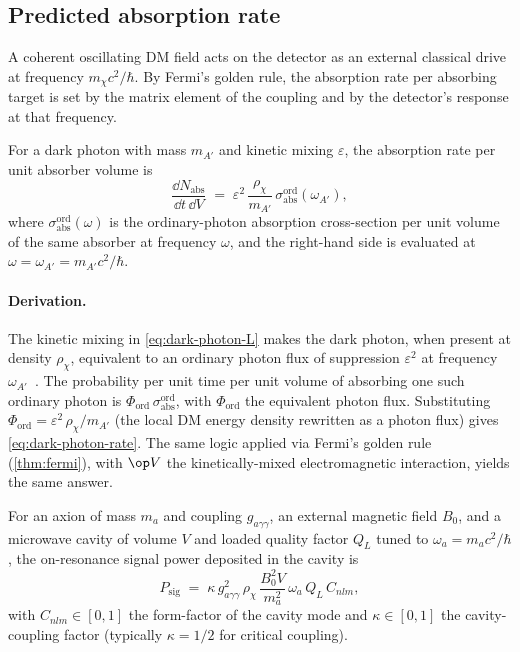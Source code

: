 \subsection{Predicted absorption rate}
\label{sec:absorption-rate}

\begin{phenomenon}
A coherent oscillating DM field acts on the detector as an external
classical drive at frequency $m_\chi c^2/\hbar$. By Fermi's golden
rule, the absorption rate per absorbing target is set by the matrix
element of the coupling and by the detector's response at that
frequency.
\end{phenomenon}

\begin{statement}
\label{stmt:dark-photon-rate}
For a dark photon with mass $m_{A'}$ and kinetic mixing $\varepsilon$,
the absorption rate per unit absorber volume is
\begin{equation}
\label{eq:dark-photon-rate}
\frac{\dd N_\text{abs}}{\dd t \,\dd V} \;=\; \varepsilon^2\,\frac{\rho_\chi}{m_{A'}}\,
\sigma_\text{abs}^\text{ord}(\omega_{A'}),
\end{equation}
where $\sigma_\text{abs}^\text{ord}(\omega)$ is the ordinary-photon
absorption cross-section per unit volume of the same absorber at
frequency $\omega$, and the right-hand side is evaluated at
$\omega=\omega_{A'}=m_{A'}c^2/\hbar$.
\end{statement}

\paragraph{Derivation.}
The kinetic mixing in \cref{eq:dark-photon-L} makes the dark
photon, when present at density $\rho_\chi$, equivalent to an
ordinary photon flux of suppression $\varepsilon^2$ at frequency
$\omega_{A'}$~\cite{caputo2021review}. The probability per unit
time per unit volume of absorbing one such ordinary photon is
$\Phi_\text{ord}\,\sigma_\text{abs}^\text{ord}$, with $\Phi_\text{ord}$
the equivalent photon flux. Substituting
$\Phi_\text{ord}=\varepsilon^2\,\rho_\chi/m_{A'}$ (the local DM
energy density rewritten as a photon flux) gives
\cref{eq:dark-photon-rate}. The same logic applied via Fermi's
golden rule (\cref{thm:fermi}), with $\op V$ the kinetically-mixed
electromagnetic interaction, yields the same answer.

\begin{statement}
\label{stmt:axion-power}
For an axion of mass $m_a$ and coupling $g_{a\gamma\gamma}$, an
external magnetic field $B_0$, and a microwave cavity of volume
$V$ and loaded quality factor $Q_L$ tuned to $\omega_a=m_a c^2/\hbar$,
the on-resonance signal power deposited in the cavity is
\begin{equation}
\label{eq:axion-power}
P_\text{sig} \;=\; \kappa\,g_{a\gamma\gamma}^2\,\rho_\chi\,
\frac{B_0^2 V}{m_a^2}\,\omega_a\,Q_L\,C_{nlm},
\end{equation}
with $C_{nlm}\in[0,1]$ the form-factor of the cavity mode and
$\kappa\in[0,1]$ the cavity-coupling factor (typically $\kappa=1/2$
for critical coupling).
\end{statement}

